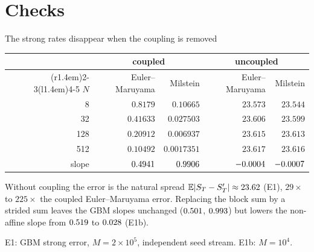 \documentclass[aspectratio=169,10pt,t]{beamer}
\newcommand{\E}{\mathbb{E}}
\begin{document}
\section{Checks}
\begin{frame}{The strong rates disappear when the coupling is removed}
\tabletop
{\tabfont
\begin{tabular*}{\textwidth}{@{}r@{\extracolsep{\fill}}rrrr@{}}
\toprule
 & \multicolumn{2}{c}{coupled} & \multicolumn{2}{c}{uncoupled}\\
\cmidrule(r{1.4em}){2-3}\cmidrule(l{1.4em}){4-5}
$N$ & Euler--Maruyama & Milstein & Euler--Maruyama & Milstein\\
\midrule
8   & $0.8179$  & $0.10665$   & $23.573$ & $23.544$\\
32  & $0.41633$ & $0.027503$  & $23.606$ & $23.599$\\
128 & $0.20912$ & $0.006937$  & $23.615$ & $23.613$\\
512 & $0.10492$ & $0.0017351$ & $23.617$ & $23.616$\\
\addlinespace[3pt]
slope & $0.4941$ & $0.9906$ & $-0.0004$ & $-0.0007$\\
\bottomrule
\end{tabular*}\par}
\blockgap
Without coupling the error is the natural spread $\E|S_T-S_T'|\approx\eOneUncoupled$ (E1), $29\times$ to $225\times$ the
coupled Euler--Maruyama error. Replacing the block sum by a
strided sum leaves the GBM slopes unchanged ($0.501$, $0.993$) but lowers the non-affine slope
from $0.519$ to $0.028$ (E1b).
\closing{E1: GBM strong error, $M=2\times10^5$, independent seed stream. E1b: $M=10^4$.}
\end{frame}
\end{document}
